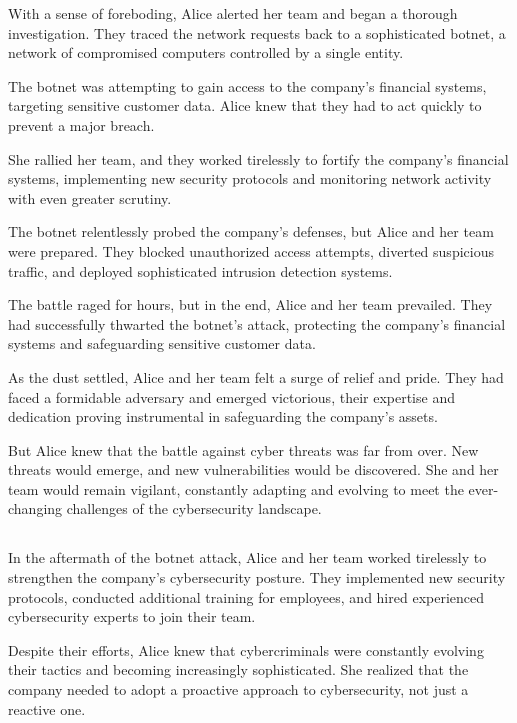 \documentclass{./StyCls/MyArticle}
\begin{document}
With a sense of foreboding, Alice alerted her team and began a thorough investigation. They traced the network requests back to a sophisticated botnet, a network of compromised computers controlled by a single entity.

The botnet was attempting to gain access to the company's financial systems, targeting sensitive customer data. Alice knew that they had to act quickly to prevent a major breach.

She rallied her team, and they worked tirelessly to fortify the company's financial systems, implementing new security protocols and monitoring network activity with even greater scrutiny.

The botnet relentlessly probed the company's defenses, but Alice and her team were prepared. They blocked unauthorized access attempts, diverted suspicious traffic, and deployed sophisticated intrusion detection systems.

The battle raged for hours, but in the end, Alice and her team prevailed. They had successfully thwarted the botnet's attack, protecting the company's financial systems and safeguarding sensitive customer data.

As the dust settled, Alice and her team felt a surge of relief and pride. They had faced a formidable adversary and emerged victorious, their expertise and dedication proving instrumental in safeguarding the company's assets.

But Alice knew that the battle against cyber threats was far from over. New threats would emerge, and new vulnerabilities would be discovered. She and her team would remain vigilant, constantly adapting and evolving to meet the ever-changing challenges of the cybersecurity landscape.

\subsection{}


In the aftermath of the botnet attack, Alice and her team worked tirelessly to strengthen the company's cybersecurity posture. They implemented new security protocols, conducted additional training for employees, and hired experienced cybersecurity experts to join their team.

Despite their efforts, Alice knew that cybercriminals were constantly evolving their tactics and becoming increasingly sophisticated. She realized that the company needed to adopt a proactive approach to cybersecurity, not just a reactive one.
\end{document}
